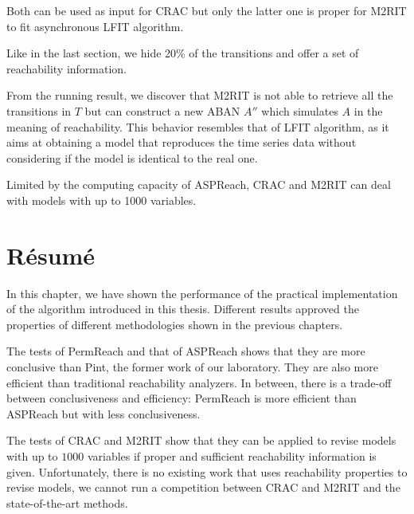Both can be used as input for CRAC but only the latter one is proper for M2RIT to fit asynchronous LFIT algorithm.

Like in the last section, we hide 20\% of the transitions and offer a set of reachability information.

From the running result, we discover that M2RIT is not able to retrieve all the transitions in $T$ but can construct a new ABAN $A''$ which simulates $A$ in the meaning of reachability.
This behavior resembles that of LFIT algorithm, as it aims at obtaining a model that reproduces the time series data without considering if the model is identical to the real one. 

Limited by the computing capacity of ASPReach, CRAC and M2RIT can deal with models with up to 1000 variables.

\section{R\'esum\'e}

In this chapter, we have shown the performance of the practical implementation of the algorithm introduced in this thesis.
Different results approved the properties of different methodologies shown in the previous chapters.

The tests of PermReach and that of ASPReach shows that they are more conclusive than Pint, the former work of our laboratory.
They are also more efficient than traditional reachability analyzers.
In between, there is a trade-off between conclusiveness and efficiency: 
PermReach is more efficient than ASPReach but with less conclusiveness.

The tests of CRAC and M2RIT show that they can be applied to revise models with up to $1000$ variables if proper and sufficient reachability information is given.
Unfortunately, there is no existing work that uses reachability properties to revise models, we cannot run a competition between CRAC and M2RIT and the state-of-the-art methods.
